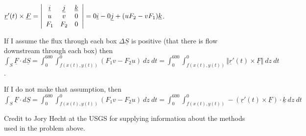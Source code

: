 \documentclass[12pt,letterpaper,noanswers]{exam}
\begin{document}
\begin{questions}
\begin{parts}
\begin{solution}
$\underline r'(t) \times \underline F = \left\vert\begin{array}{c c c} \underline i & \underline j & \underline k \\
u & v & 0 \\
F_1 & F_2 & 0 \end{array}\right\vert = 0\underline i - 0\underline j + (uF_2 - vF_1)\underline k$.

If I assume the flux through each box $\Delta \underline S$ is positive (that there is flow downstream through each box) then $\int_S \underline F\cdot d\underline S = \int_0^{600}\int_{f(x(t),y(t))}^0 (F_1 v - F_2 u)\ dz\ dt = \int_0^{600}\int_{f(x(t),y(t))}^0 \Vert \underline r'(t) \times \underline F\Vert \ dz\ dt$.

If I do not make that assumption, then $\int_S \underline F\cdot d\underline S = \int_0^{600}\int_{f(x(t),y(t))}^0 (F_1 v - F_2 u)\ dz\ dt = \int_0^{600}\int_{f(x(t),y(t))}^0 -(\underline r'(t) \times \underline F)\cdot \underline k \ dz\ dt$

\end{solution}
\end{parts}

Credit to Jory Hecht at the USGS for supplying information about the methods used in the problem above. 
 








\end{questions}
\end{document}
